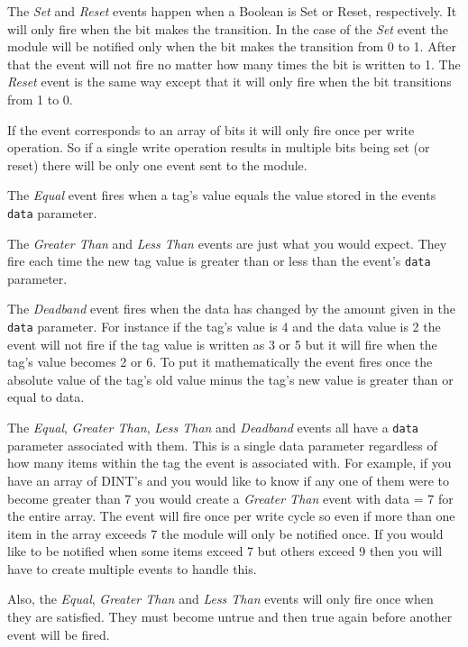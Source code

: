 The \textit{Set} and \textit{Reset} events happen when a Boolean is Set or Reset, respectively.  It will only fire when the bit makes the transition.  In the case of the \textit{Set} event the module will be notified only when the bit makes the transition from 0 to 1.  After that the event will not fire no matter how many times the bit is written to 1.  The \textit{Reset} event is the same way except that it will only fire when the bit transitions from 1 to 0.

If the event corresponds to an array of bits it will only fire once per write operation.  So if a single write operation results in multiple bits being set (or reset) there will be only one event sent to the module.

The \textit{Equal} event fires when a tag's value equals the value stored in the events \verb|data| parameter.

The \textit{Greater Than} and \textit{Less Than} events are just what you would expect.  They fire each time the new tag value is greater than or less than the event's \verb|data| parameter.  

The \textit{Deadband} event fires when the data has changed by the amount given in the \verb|data| parameter.  For instance if the tag's value is 4 and the data value is 2 the event will not fire if the tag value is written as 3 or 5 but it will fire when the tag's value becomes 2 or 6.  To put it mathematically the event fires once the absolute value of the tag's old value minus the tag's new value is greater than or equal to data.

The \textit{Equal}, \textit{Greater Than}, \textit{Less Than} and \textit{Deadband} events all have a \verb|data| parameter associated with them.  This is a single data parameter regardless of how many items within the tag the event is associated with.  For example, if you have an array of DINT's and you would like to know if any one of them were to become greater than 7 you would create a \textit{Greater Than} event with data = 7 for the entire array.  The event will fire once per write cycle so even if more than one item in the array exceeds 7 the module will only be notified once.  If you would like to be notified when some items exceed 7 but others exceed 9 then you will have to create multiple events to handle this.

Also, the \textit{Equal}, \textit{Greater Than} and \textit{Less Than} events will only fire once when they are satisfied.  They must become untrue and then true again before another event will be fired.

